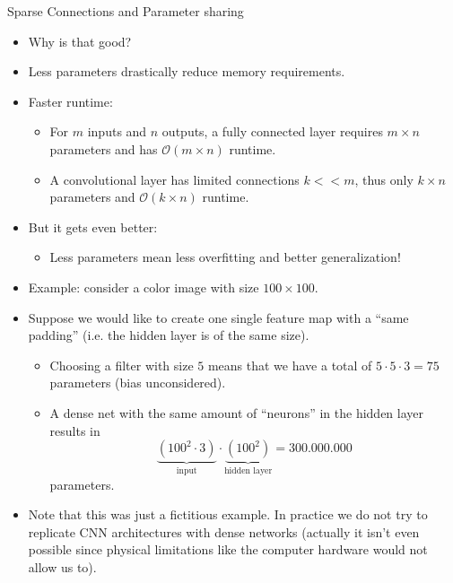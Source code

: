 {\begin{itemize}
  \end{itemize}

}
\begin{vbframe}{Sparse Connections and Parameter sharing}
  \begin{itemize}
    \item Why is that good?
    \item Less parameters drastically reduce memory requirements.
    \item Faster runtime:
    \begin{itemize}
      \item For $m$ inputs and $n$ outputs, a fully connected layer requires $m\times n$ parameters and has $\mathcal{O}(m\times n)$ runtime.
      \item A convolutional layer has limited connections $k<<m$, thus only $k\times n$ parameters and $\mathcal{O}(k\times n)$ runtime.
    \end{itemize}
    \item But it gets even better:
    \begin{itemize}
      \item Less parameters mean less overfitting and better generalization!
    \end{itemize}
  \end{itemize}
\framebreak
  \begin{itemize}
    \item Example: consider a color image with size $100 \times 100$.
    \item Suppose we would like to create one single feature map with a \enquote{same padding} (i.e. the hidden layer is of the same size).
    \begin{itemize}
      \item Choosing a filter with size $5$ means that we have a total of $5 \cdot 5 \cdot 3 = 75$ parameters (bias unconsidered).
      \item A dense net with the same amount of \enquote{neurons} in the hidden layer results in 
      $$\underbrace{(100^2 \cdot 3)}_{\text{input}} \cdot \underbrace{(100^2)}_{\text{hidden layer}} = 300.000.000 $$ parameters.
      
      
    \end{itemize}
  \item Note that this was just a fictitious example. In practice we do not try to replicate CNN architectures with dense networks (actually it isn't even possible since physical limitations like the computer hardware would not allow us to).
  \end{itemize}
\end{vbframe}

